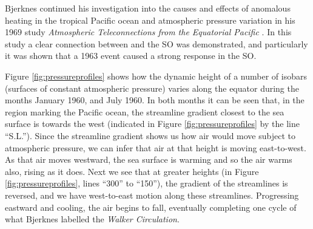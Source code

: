 Bjerknes continued his investigation into the causes and effects of anomalous
heating in the tropical Pacific ocean and atmospheric pressure variation in his
1969 study \emph{Atmospheric Teleconnections from the Equatorial Pacific}
\citep{bjerknes1969}. In this study a clear connection between \elnino{} and the
SO was demonstrated, and particularly it was shown that a 1963 \elnino{} event
caused a strong response in the SO.

Figure \ref{fig:pressureprofiles} shows how the dynamic height of a number of
isobars (surfaces of constant atmospheric pressure) varies along the equator
during the months January 1960, and July 1960. In both months it can be seen
that, in the region marking the Pacific ocean, the streamline gradient closest
to the sea surface is towards the west (indicated in Figure
\ref{fig:pressureprofiles} by the line ``S.L.''). Since the streamline gradient
shows us how air would move subject to atmospheric pressure, we can infer that
air at that height is moving east-to-west. As that air moves westward, the sea
surface is warming and so the air warms also, rising as it does. Next we see
that at greater heights (in Figure \ref{fig:pressureprofiles}, lines ``300'' to
``150''), the gradient of the streamlines is reversed, and we have west-to-east
motion along these streamlines. Progressing eastward and cooling, the air begins
to fall, eventually completing one cycle of what Bjerknes labelled the
\emph{Walker Circulation}.

